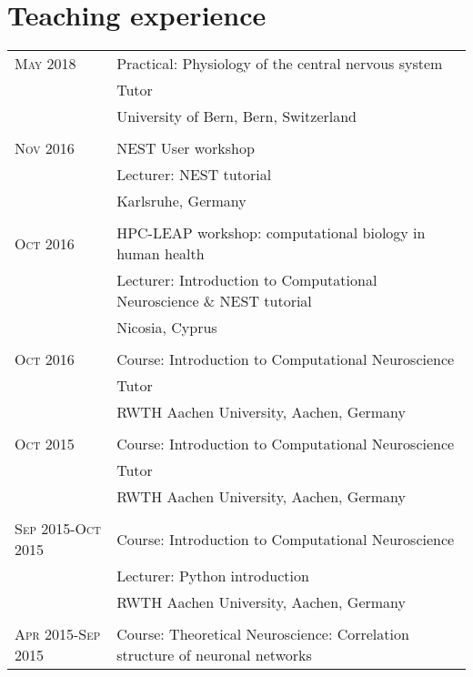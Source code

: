 \section{Teaching experience}
\begin{longtable}{>{\hfill}p{3.15cm}|p{10.4cm}}
  \textsc{May} 2018 & Practical: Physiology of the central nervous system \\
  & \footnotesize Tutor \\
  & \footnotesize University of Bern, Bern, Switzerland \\
  \multicolumn{2}{c}{} \\
  \textsc{Nov} 2016 & NEST User workshop \\
  & \footnotesize Lecturer: NEST tutorial \\
  & \footnotesize Karlsruhe, Germany \\
  \multicolumn{2}{c}{} \\
  \textsc{Oct} 2016 & HPC-LEAP workshop: computational biology in human health \\
                    & \footnotesize Lecturer: Introduction to Computational Neuroscience \& NEST tutorial \\
                    & \footnotesize Nicosia, Cyprus \\
  \multicolumn{2}{c}{} \\
  \textsc{Oct} 2016 & Course: Introduction to Computational Neuroscience \\
  & \footnotesize Tutor  \\
  & \footnotesize RWTH Aachen University, Aachen, Germany \\
  \multicolumn{2}{c}{} \\
  \textsc{Oct} 2015 & Course: Introduction to Computational Neuroscience \\
  & \footnotesize Tutor \\
  & \footnotesize RWTH Aachen University, Aachen, Germany \\
  \multicolumn{2}{c}{} \\
  \textsc{Sep} 2015-\textsc{Oct} 2015 & Course: Introduction to Computational Neuroscience \\
  & \footnotesize Lecturer: Python introduction \\
  & \footnotesize RWTH Aachen University, Aachen, Germany \\
  \multicolumn{2}{c}{} \\
  \textsc{Apr} 2015-\textsc{Sep} 2015 & Course: Theoretical Neuroscience: Correlation structure of neuronal networks \\ 

\end{longtable}
